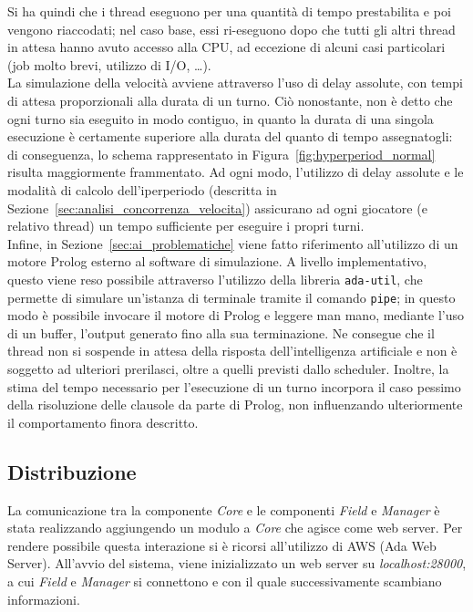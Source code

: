 Si ha quindi che i thread eseguono per una quantità di tempo prestabilita e poi vengono riaccodati; nel caso base, essi ri-eseguono dopo che tutti gli altri thread in attesa hanno avuto accesso alla CPU, ad eccezione di alcuni casi particolari (job molto brevi, utilizzo di I/O, \ldots).\\

La simulazione della velocità avviene attraverso l'uso di delay assolute, con tempi di attesa proporzionali alla durata di un turno. Ciò nonostante, non è detto che ogni turno sia eseguito in modo contiguo, in quanto la durata di una singola esecuzione è certamente superiore alla durata del quanto di tempo assegnatogli: di conseguenza, lo schema rappresentato in Figura~\ref{fig:hyperperiod_normal} risulta maggiormente frammentato. Ad ogni modo, l'utilizzo di delay assolute e le modalità di calcolo dell'iperperiodo (descritta in Sezione~\ref{sec:analisi_concorrenza_velocita}) assicurano ad ogni giocatore (e relativo thread) un tempo sufficiente per eseguire i propri turni.\\

Infine, in Sezione~\ref{sec:ai_problematiche} viene fatto riferimento all'utilizzo di un motore Prolog esterno al software di simulazione. A livello implementativo, questo viene reso possibile attraverso l'utilizzo della libreria \texttt{ada-util}, che permette di simulare un'istanza di terminale tramite il comando \texttt{pipe}; in questo modo è possibile invocare il motore di Prolog e leggere man mano, mediante l'uso di un buffer, l'output generato fino alla sua terminazione. Ne consegue che il thread non si sospende in attesa della risposta dell'intelligenza artificiale e non è soggetto ad ulteriori prerilasci, oltre a quelli previsti dallo scheduler. Inoltre, la stima del tempo necessario per l'esecuzione di un turno incorpora il caso pessimo della risoluzione delle clausole da parte di Prolog, non influenzando ulteriormente il comportamento finora descritto.

\subsection{Distribuzione}
\label{sec:implementazione_distribuzione}

La comunicazione tra la componente \emph{Core} e le componenti \emph{Field} e \emph{Manager} è stata realizzando aggiungendo un modulo a \emph{Core} che agisce come web server. Per rendere possibile questa interazione si è ricorsi all'utilizzo di AWS (Ada Web Server). All'avvio del sistema, viene inizializzato un web server su \emph{localhost:28000}, a cui \emph{Field} e \emph{Manager} si connettono e con il quale successivamente scambiano informazioni.\\

